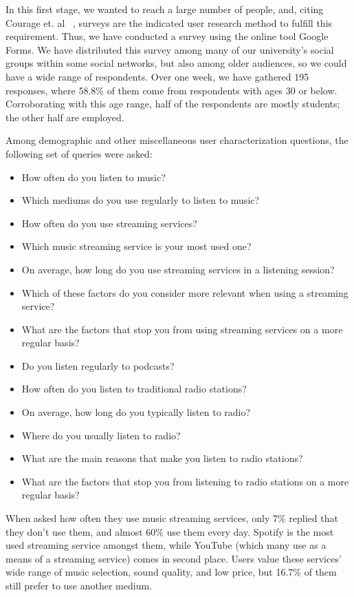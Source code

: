 In this first stage, we wanted to reach a large number of people, and, citing Courage et. al ~\cite{Courage2005}, surveys are the indicated user research method to fulfill this requirement. Thus, we have conducted a survey using the online tool Google Forms. We have distributed this survey among many of our university's social groups within some social networks, but also among older audiences, so we could have a wide range of respondents. Over one week, we have gathered 195 responses, where 58.8\% of them come from respondents with ages 30 or below. Corroborating with this age range, half of the respondents are mostly students; the other half are employed.

Among demographic and other miscellaneous user characterization questions, the following set of queries were asked:

\begin{itemize}
  \item How often do you listen to music?
  \item Which mediums do you use regularly to listen to music?
  \item How often do you use streaming services?
  \item Which music streaming service is your most used one?
  \item On average, how long do you use streaming services in a listening session?
  \item Which of these factors do you consider more relevant when using a streaming service?
  \item What are the factors that stop you from using streaming services on a more regular basis?
  \item Do you listen regularly to podcasts?
  \item How often do you listen to traditional radio stations?
  \item On average, how long do you typically listen to radio?
  \item Where do you usually listen to radio?
  \item What are the main reasons that make you listen to radio stations?
  \item What are the factors that stop you from listening to radio stations on a more regular basis?
\end{itemize}

When asked how often they use music streaming services, only 7\% replied that they don't use them, and almost 60\% use them every day. Spotify is the most used streaming service amongst them, while YouTube (which many use as a means of a streaming service) comes in second place. Users value these services' wide range of music selection, sound quality, and low price, but 16.7\% of them still prefer to use another medium.


